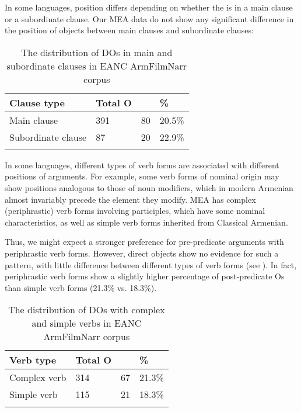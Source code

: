 \documentclass[output=paper,colorlinks,citecolor=brown,draftmode]{langscibook}
\begin{document}
 In some languages,  position differs depending on whether the  is in a main clause or a subordinate clause. Our MEA data do not show any significant difference in the position of objects between main clauses and subordinate clauses:

\begin{table}
    \begin{tabularx}{.8\textwidth}{lYYY}
\lsptoprule
Clause type & Total O &  & \%  \\
\midrule
Main clause&391&80&20.5\% \\
Subordinate clause&87&20&22.9\% \\
\lspbottomrule
    \end{tabularx}
    \caption{The distribution of DOs in main and subordinate clauses in EANC ArmFilmNarr corpus}
    \label{Armenian:tab:13}
\end{table}

 In some languages, different types of verb forms are associated with different positions of arguments. For example, some verb forms of nominal origin may show  positions analogous to those of noun modifiers, which in modern Armenian almost invariably precede the element they modify. MEA has complex (periphrastic) verb forms involving participles, which have some nominal characteristics, as well as simple verb forms inherited from Classical Armenian.

Thus, we might expect a stronger preference for pre-predicate arguments with periphrastic verb forms. However, direct objects show no evidence for such a pattern, with little difference between different types of verb forms (see ). In fact, periphrastic verb forms show a slightly higher percentage of post-predicate Os than simple verb forms (21.3\% vs. 18.3\%).

\begin{table}
    \begin{tabularx}{.8\textwidth}{lYYY}
\lsptoprule
Verb type & Total O\footnotemark &  & \%  \\
\midrule
Complex verb&314&67&21.3\% \\
Simple verb&115&21&18.3\% \\
\lspbottomrule
    \end{tabularx}
    \caption{The distribution of DOs with complex and simple verbs in EANC ArmFilmNarr corpus}
    \label{Armenian:tab:14}
\end{table}
\end{document}
